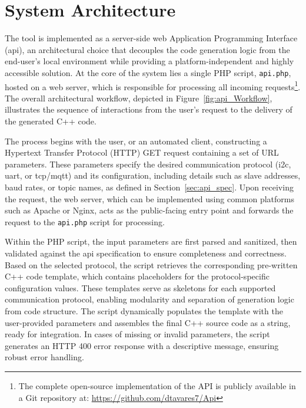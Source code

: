 
\section{System Architecture}
\label{sec:design_decisions}

The tool is implemented as a server-side web Application Programming Interface (\gls{api}), an architectural choice that decouples the code generation logic from the end-user's local environment while providing a platform-independent and highly accessible solution. At the core of the system lies a single PHP script, \texttt{api.php}, hosted on a web server, which is responsible for processing all incoming requests\footnote{The complete open-source implementation of the API is publicly available in a Git repository at: \url{https://github.com/dtavares7/Api}}. The overall architectural workflow, depicted in Figure~\ref{fig:api_Workflow}, illustrates the sequence of interactions from the user's request to the delivery of the generated C++ code.

The process begins with the user, or an automated client, constructing a Hypertext Transfer Protocol (HTTP) GET request containing a set of URL parameters. These parameters specify the desired communication protocol (\gls{i2c}, \gls{uart}, or \gls{tcp}/\gls{mqtt}) and its configuration, including details such as slave addresses, baud rates, or topic names, as defined in Section~\ref{sec:api_spec}. Upon receiving the request, the web server, which can be implemented using common platforms such as Apache or Nginx, acts as the public-facing entry point and forwards the request to the \texttt{api.php} script for processing.

Within the PHP script, the input parameters are first parsed and sanitized, then validated against the \gls{api} specification to ensure completeness and correctness. Based on the selected protocol, the script retrieves the corresponding pre-written C++ code template, which contains placeholders for the protocol-specific configuration values. These templates serve as skeletons for each supported communication protocol, enabling modularity and separation of generation logic from code structure. The script dynamically populates the template with the user-provided parameters and assembles the final C++ source code as a string, ready for integration. In cases of missing or invalid parameters, the script generates an HTTP 400 error response with a descriptive message, ensuring robust error handling.

